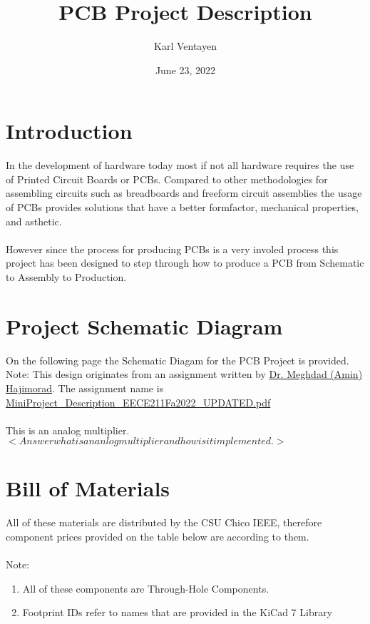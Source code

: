 \documentclass[12pt, letterpaper]{article}
\title{PCB Project Description}
\author{Karl Ventayen}
\date{June 23, 2022}
\begin{document}
\begin{comment}
\begin{titlepage}
    \maketitle
\end{titlepage}
\end{comment}

\maketitle

\tableofcontents{}

\section{Introduction}
In the development of hardware today most if not all hardware requires the use of Printed Circuit Boards or PCBs. Compared to other methodologies for assembling circuits such as breadboards and freeform circuit assemblies the usage of PCBs provides solutions that have a better formfactor, mechanical properties, and asthetic.\\
\\
However since the process for producing PCBs is a very involed process this project has been designed to step through how to produce a PCB from Schematic to Assembly to Production.

\section{Project Schematic Diagram}
On the following page the Schematic Diagam for the PCB Project is provided.\\
Note: This design originates from an assignment written by \href{https://www.csuchico.edu/eece/faculty-staff/faculty/meghdad-hajimorad.shtml}{Dr. Meghdad (Amin) Hajimorad}. The assignment name is \href{run:./assets/MiniProject_Description_EECE211Fa2022_UPDATED.pdf}{MiniProject\_Description\_EECE211Fa2022\_UPDATED.pdf}\\
\\
This is an analog multiplier. $<Answer what is an anlog multiplier and how is it implemented.>$


\section{Bill of Materials}
All of these materials are distributed by the CSU Chico IEEE, therefore component prices provided on the table below are according to them.\\
\\
Note:
\begin{enumerate}
    \item All of these components are Through-Hole Components.
    \item Footprint IDs refer to names that are provided in the KiCad 7 Library
\end{enumerate}
\end{document}
